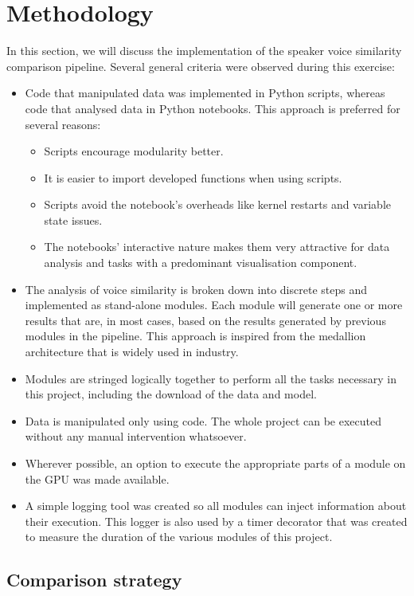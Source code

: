 \documentclass[conference]{IEEEtran}
\begin{document}
\section{Methodology}

In this section, we will discuss the implementation of the speaker voice similarity comparison pipeline. Several general criteria were observed during this exercise:
\begin{itemize}
	\item Code that manipulated data was implemented in Python scripts, whereas code that analysed data in Python notebooks. This approach is preferred for several reasons:
	\begin{itemize}
		\item Scripts encourage modularity better.
		\item It is easier to import developed functions when using scripts.
		\item Scripts avoid the notebook's overheads like kernel restarts and variable state issues.
		\item The notebooks' interactive nature makes them very attractive for data analysis and tasks with a predominant visualisation component.
	\end{itemize}
	\item The analysis of voice similarity is broken down into discrete steps and implemented as stand-alone modules.    Each module will generate one or more results that are, in most cases, based on the results generated by previous modules in the pipeline. This approach is inspired from the medallion architecture that is widely used in industry.
	\item Modules are stringed logically together to perform all the tasks necessary in this project, including the download of the data and model.
	\item Data is manipulated only using code. The whole project can be executed without any manual intervention whatsoever.
	\item Wherever possible, an option to execute the appropriate parts of a module on the GPU was made available.
	\item A simple logging tool was created so all modules can inject information about their execution. This logger is also used by a timer decorator that was created to measure the duration of the various modules of this project.
\end{itemize}

\subsection{Comparison strategy}
\label{ssec:comparison-strategy}
\end{document}
